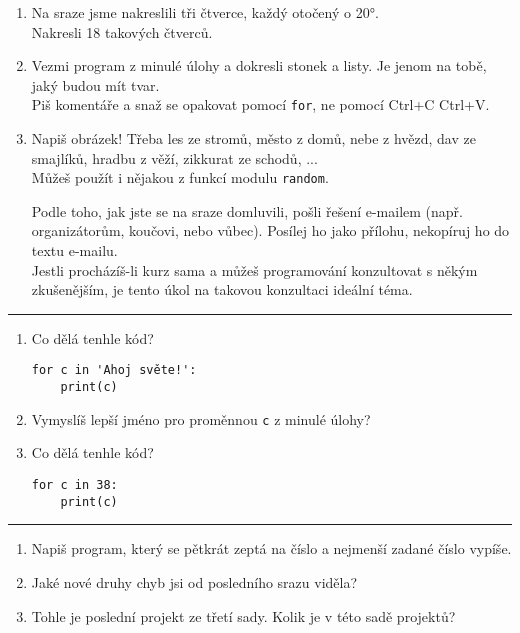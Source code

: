 \documentclass[a4paper,10pt]{article}
\begin{document}
\begin{enumerate}[resume]
\item Na sraze jsme nakreslili tři čtverce, každý otočený o 20°.
    \\Nakresli 18 takových čtverců.

\item Vezmi program z minulé úlohy a dokresli stonek a listy.
    Je jenom na tobě, jaký budou mít tvar.
    \\Piš komentáře a snaž se opakovat pomocí \verb+for+,
        ne pomocí Ctrl+C Ctrl+V.

\item Napiš obrázek! Třeba les ze stromů, město z domů, nebe z hvězd,
        dav ze smajlíků, hradbu z věží, zikkurat ze schodů, ...
    \\Můžeš použít i nějakou z funkcí modulu \verb+random+.

    Podle toho, jak jste se na sraze domluvili, pošli řešení e-mailem
    (např. organizátorům, koučovi, nebo vůbec).
    Posílej ho jako přílohu, nekopíruj ho do textu e-mailu.
    \\Jestli procházíš-li kurz sama a můžeš programování konzultovat s někým
    zkušenějším, je tento úkol na takovou konzultaci ideální téma.

\end{enumerate}

\hrule

\begin{enumerate}[resume]
\item Co dělá tenhle kód?
\begin{verbatim}
for c in 'Ahoj světe!':
    print(c)
\end{verbatim}

\item Vymyslíš lepší jméno pro proměnnou \verb+c+ z minulé úlohy?

\item Co dělá tenhle kód?
\begin{verbatim}
for c in 38:
    print(c)
\end{verbatim}

\end{enumerate}

\hrule

\begin{enumerate}[resume]
\item Napiš program, který se pětkrát zeptá na číslo a nejmenší zadané číslo vypíše.

\item Jaké nové druhy chyb jsi od posledního srazu viděla?

\item Tohle je poslední projekt ze třetí sady. Kolik je v této sadě projektů?

\end{enumerate}
\end{document}
